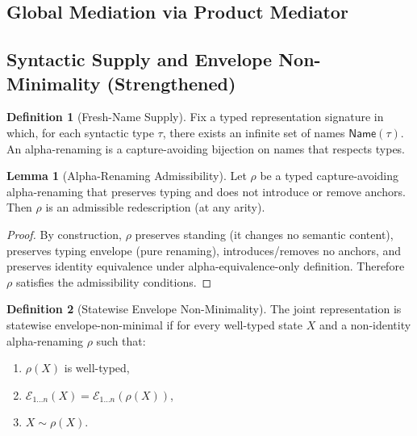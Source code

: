 \documentclass[11pt]{article}
\theoremstyle{definition}
\newtheorem{definition}{Definition}
\newtheorem{lemma}{Lemma}
\begin{document}
\subsection{Global Mediation via Product Mediator}





\subsection{Syntactic Supply and Envelope Non-Minimality (Strengthened)}

\begin{definition}[Fresh-Name Supply]
Fix a typed representation signature in which, for each syntactic type $\tau$,
there exists an infinite set of names $\mathsf{Name}(\tau)$.
An alpha-renaming is a capture-avoiding bijection on names that respects types.


\begin{lemma}[Alpha-Renaming Admissibility]
Let $\rho$ be a typed capture-avoiding alpha-renaming that preserves typing and does not introduce or remove anchors.
Then $\rho$ is an admissible redescription (at any arity).
\end{lemma}

\begin{proof}
By construction, $\rho$ preserves standing (it changes no semantic content),
preserves typing envelope (pure renaming),
introduces/removes no anchors,
and preserves identity equivalence under alpha-equivalence-only definition.
Therefore $\rho$ satisfies the admissibility conditions.
\end{proof}

\end{definition}

\begin{definition}[Statewise Envelope Non-Minimality]
The joint representation is statewise envelope-non-minimal if for every well-typed state $X$
and a non-identity alpha-renaming $\rho$ such that:
\begin{enumerate}[label=(\roman*)]
    \item $\rho(X)$ is well-typed,
    \item $\mathcal{E}_{1\ldots n}(X)=\mathcal{E}_{1\ldots n}(\rho(X))$,
    \item $X \sim \rho(X)$.
\end{enumerate}
\end{definition}
\end{document}
